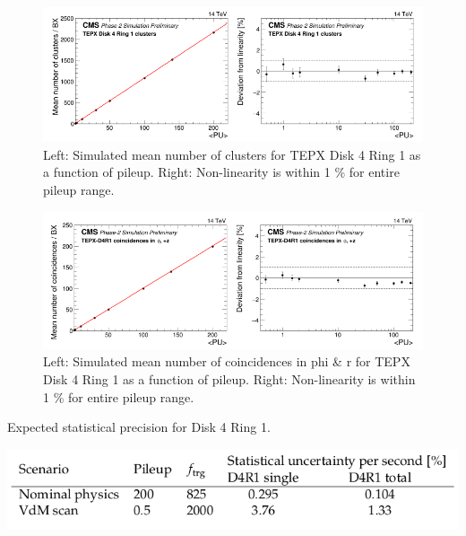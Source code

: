 \documentclass[a4paper,11pt]{article}
\begin{document}
\begin{figure}[htb]
  \centering
  \includegraphics[width=0.6\columnwidth]{SP.png}
  \caption{Left: Simulated mean number of clusters for TEPX Disk 4 Ring 1 as a function of pileup. Right: Non-linearity is within 1 \% for entire pileup range.}
  \label{fig:CMS}
\end{figure}


\begin{figure}[htb]
  \centering
  \includegraphics[width=0.6\columnwidth]{SP1.png}
  \caption{Left: Simulated mean number of coincidences in phi \& r for TEPX Disk 4 Ring 1 as a function of pileup. Right: Non-linearity is within 1 \% for entire pileup range. }
  \label{fig:CMS}
\end{figure}

\begin{table}[htb]
  \centering
   \caption{Expected statistical precision for Disk 4 Ring 1.}
  \includegraphics[width=0.6\columnwidth]{SP3.png}
  \label{fig:CMS}
\end{table}



\newpage
\end{document}
